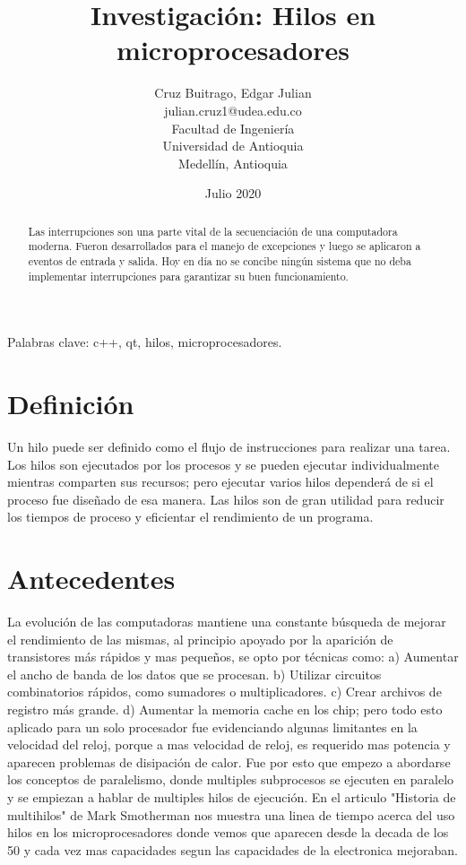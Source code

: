\documentclass[]{article}
\title{Investigación: Hilos en microprocesadores}
\author{Cruz Buitrago, Edgar Julian \\ julian.cruz1@udea.edu.co \\ Facultad de Ingeniería \\ Universidad de Antioquia \\ Medellín, Antioquia}
\date{Julio 2020}
\begin{document}
	
	\maketitle
	\begin{multicols}{2}
		\justify
		\begin{abstract}		
			Las interrupciones son una parte vital de la secuenciación de una computadora moderna. Fueron desarrollados para el manejo de excepciones y luego se aplicaron a eventos de entrada y salida. Hoy en día no se concibe ningún sistema que no deba implementar interrupciones para garantizar su buen funcionamiento.
		\end{abstract}
		{\smallskip \keywords Palabras clave: c++, qt, hilos, microprocesadores.}
		\section{Definición}
		Un hilo puede ser definido como el flujo de instrucciones para realizar una tarea.\cite{jesgargardon}  Los hilos son ejecutados por los procesos y se pueden ejecutar individualmente mientras comparten sus recursos; pero ejecutar varios hilos dependerá de si el proceso fue diseñado de esa manera.  Las hilos son de gran utilidad para reducir los tiempos de proceso y eficientar el rendimiento de un programa.\cite{whatsabyte}
		\section{Antecedentes}
		La evolución de las computadoras mantiene una constante búsqueda de mejorar el rendimiento de las mismas, al principio apoyado por la aparición de transistores más rápidos y mas pequeños, se opto por técnicas como: a) Aumentar el ancho de banda de los datos que se procesan. b) Utilizar circuitos combinatorios rápidos, como sumadores o multiplicadores. c) Crear archivos de registro más grande. d) Aumentar la memoria cache en los chip; pero todo esto aplicado para un solo procesador fue evidenciando algunas limitantes en la velocidad del reloj, porque a mas velocidad de reloj, es requerido mas potencia y aparecen problemas de disipación de calor. Fue por esto que empezo a abordarse los conceptos de paralelismo, donde multiples subprocesos se ejecuten en paralelo y se empiezan a hablar de multiples hilos de ejecución. \cite{history2} En el articulo "Historia de multihilos" de Mark Smotherman\cite{history1} nos muestra una linea de tiempo acerca del uso hilos en los microprocesadores donde vemos que aparecen desde la decada de los 50 y cada vez mas capacidades segun las capacidades de la electronica mejoraban. 

\end{multicols}
\end{document}
